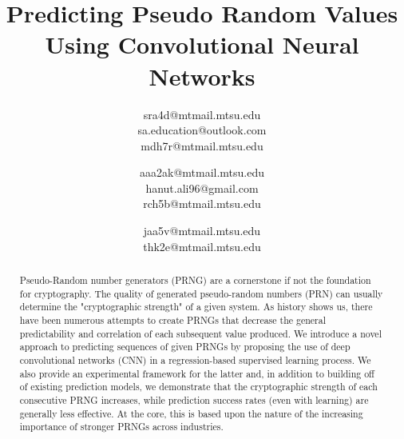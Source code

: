 \documentclass[conference]{IEEEtran}
\begin{document}

\title{Predicting Pseudo Random Values Using Convolutional Neural Networks\\}



\author{
sra4d@mtmail.mtsu.edu \\
sa.education@outlook.com\\[0.4cm]  %
mdh7r@mtmail.mtsu.edu \\
\and
{}
aaa2ak@mtmail.mtsu.edu\\
hanut.ali96@gmail.com\\[0.4cm]  %
rch5b@mtmail.mtsu.edu \\
\and
{}
jaa5v@mtmail.mtsu.edu\\[0.8cm]  %
thk2e@mtmail.mtsu.edu \\
}
\maketitle

\begin{abstract}
Pseudo-Random number generators (PRNG) are a cornerstone if not the foundation for cryptography. The quality of generated pseudo-random numbers (PRN) can usually determine the "cryptographic strength" of a given system. As history shows us, there have been numerous attempts to create PRNGs that decrease the general predictability and correlation of each subsequent value produced. We introduce a novel approach to predicting sequences of given PRNGs by proposing the use of deep convolutional networks (CNN) in a regression-based supervised learning process.
We also provide an experimental framework for the latter and, in addition to building off of existing prediction models, we demonstrate that the cryptographic strength of each consecutive PRNG increases, while prediction success rates (even with learning) are generally less effective. At the core, this is based upon the nature of the increasing importance of stronger PRNGs across industries.
\end{abstract}
\end{document}
